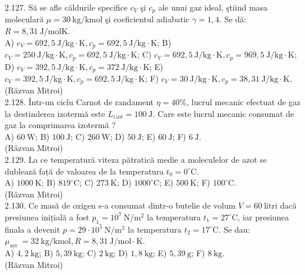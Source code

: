 2.127. Să se afle căldurile specifice $c_{V}$ şi $c_{p}$ ale unui gaz ideal, ştiind masa moleculară $\mu=30 \mathrm{~kg} / \mathrm{kmol}$ şi coeficientul adiabatic $\gamma=1,4$. Se dă: $R=8,31 \mathrm{~J} / \mathrm{molK}$.\\ A) $c_{V}=692,5 \mathrm{~J} / \mathrm{kg} \cdot \mathrm{K}, c_{p}=692,5 \mathrm{~J} / \mathrm{kg} \cdot \mathrm{K}$; B) $c_{V}=250 \mathrm{~J} / \mathrm{kg} \cdot \mathrm{K}, c_{p}=692,5 \mathrm{~J} / \mathrm{kg} \cdot \mathrm{K}$; C) $c_{V}=692,5 \mathrm{~J} / \mathrm{kg} \cdot \mathrm{K}, c_{p}=969,5 \mathrm{~J} / \mathrm{kg} \cdot \mathrm{K}$; D) $c_{V}=392,5 \mathrm{~J} / \mathrm{kg} \cdot \mathrm{K}, c_{p}=372 \mathrm{~J} / \mathrm{kg} \cdot \mathrm{K}$; E) $c_{V}=392,5 \mathrm{~J} / \mathrm{kg} \cdot \mathrm{K}, c_{p}=692,5 \mathrm{~J} / \mathrm{kg} \cdot \mathrm{K}$; F) $c_{V}=30 \mathrm{~J} / \mathrm{kg} \cdot \mathrm{K}, c_{p}=38,31 \mathrm{~J} / \mathrm{kg} \cdot \mathrm{K}$.\\ (Răzvan Mitroi)\\

2.128. Într-un ciclu Carnot de randament $\eta=40 \%$, lucrul mecanic efectuat de gaz la destinderea izotermă este $L_{i z o t}=100 \mathrm{~J}$. Care este lucrul mecanic consumat de gaz la comprimarea izotermă ?\\ A) $60 \mathrm{~W}$; B) $100 \mathrm{~J}$; C) $260 \mathrm{~W}$; D) $50 \mathrm{~J}$; E) $60 \mathrm{~J}$; F) $6 \mathrm{~J}$.\\ (Rǎzvan Mitroi)\\

2.129. La ce temperatură viteza pătratică medie a moleculelor de azot se dublează față de valoarea de la temperatura $t_{0}=0^{\circ} \mathrm{C}$.\\ A) $1000 \mathrm{~K}$; B) $819^{\circ} \mathrm{C}$; C) $273 \mathrm{~K}$; D) $1000^{\circ} \mathrm{C}$; E) $500 \mathrm{~K}$; F) $100^{\circ} \mathrm{C}$.\\ (Rǎzvan Mitroi)\\

2.130. Ce masă de oxigen s-a consumat dintr-o butelie de volum $V=60 \mathrm{~litri}$ dacă presiunea inițială a fost $p_{1}=10^{7} \mathrm{~N} / \mathrm{m}^{2}$ la temperatura $t_{1}=27^{\circ} \mathrm{C}$, iar presiunea finala a devenit $p=29 \cdot 10^{5} \mathrm{~N} / \mathrm{m}^{2}$ la temperatura $t_{2}=17^{\circ} \mathrm{C}$. Se dau: $\mu_{\text {aer }}=32 \mathrm{~kg} / \mathrm{kmol}, R=8,31 \mathrm{~J} / \mathrm{mol} \cdot \mathrm{K}$.\\ A) $4,2 \mathrm{~kg}$; B) $5,39 \mathrm{~kg}$; C) $2 \mathrm{~kg}$; D) $1,8 \mathrm{~kg}$; E) $5,39 \mathrm{~g}$; F) $8 \mathrm{~kg}$.\\ (Răzvan Mitroi)\\

